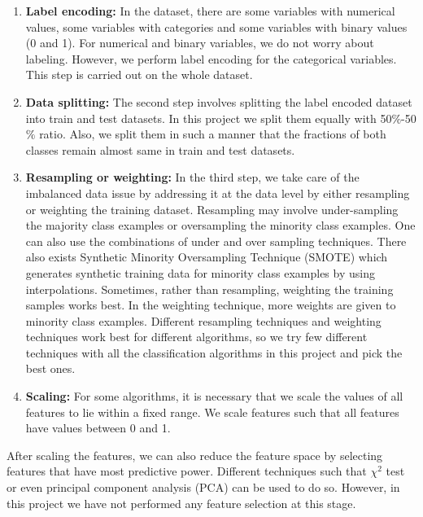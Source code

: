 \documentclass[12pt]{article}
\begin{document}
\begin{enumerate}  
\item \textbf{Label encoding:} In the dataset, there are some variables with numerical values, some variables with categories and some variables with binary values (0 and 1). For numerical and binary variables, we do not worry about labeling. However, we perform label encoding for the categorical variables. This step is carried out on the whole dataset. 
\item \textbf{Data splitting:} The second step involves splitting the label encoded dataset into train and test datasets. In this project we split them equally with 50$\%$-50$\%$ ratio. Also, we split them in such a manner that the fractions of both classes remain almost same in train and test datasets.
\item \textbf{Resampling or weighting:} In the third step, we take care of the imbalanced data issue by addressing it at the data level by either resampling or weighting the training dataset. Resampling may involve under-sampling the majority class examples or oversampling the minority class examples. One can also use the combinations of under and over sampling techniques. There also exists Synthetic Minority Oversampling Technique (SMOTE) which generates synthetic training data for minority class examples by using interpolations. Sometimes, rather than resampling, weighting the training samples works best. In the weighting technique, more weights are given to minority class examples. Different resampling techniques and weighting techniques work best for different algorithms, so we try few different techniques with all the classification algorithms in this project and pick the best ones.  
\item \textbf{Scaling:} For some algorithms, it is necessary that we scale the values of all features to lie within a fixed range. We scale features such that all features have values between 0 and 1. 
\end{enumerate}

After scaling the features, we can also reduce the feature space by selecting features that have most predictive power. Different techniques such that $\chi^2$ test or even principal component analysis (PCA) can be used to do so. However, in this project we have not performed any feature selection at this stage. 
\end{document}
